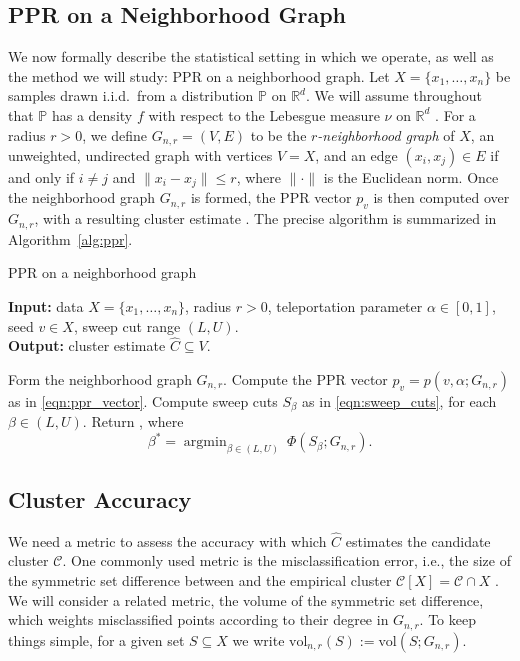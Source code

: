 \documentclass[twoside,11pt]{article}
\newcommand{\Reals}{\mathbb{R}}
\newcommand{\1}{\mathbf{1}}
\DeclareMathOperator*{\argmin}{argmin}
\newcommand{\Rd}{\Reals^d}
\newcommand{\mc}[1]{\mathcal{#1}}
\newcommand{\Pbb}{\mathbb{P}}
\newcommand{\wh}[1]{\widehat{#1}}
\newcommand{\vol}{\mathrm{vol}}
\begin{document}
\subsection{PPR on a Neighborhood Graph}
\label{subsec:ppr_neighborhood_graph}
We now formally describe the statistical setting in which we operate, as well as the method we will study: PPR on a neighborhood graph. Let $X = \{x_1,\ldots, x_n\}$ be samples drawn i.i.d.\ from a distribution $\Pbb$ on $\Rd$. We will assume throughout that $\Pbb$ has a density $f$ with respect to the Lebesgue measure $\nu$ on $\Rd$ . For a radius $r > 0$, we define $G_{n,r}=(V,E)$ to be the \emph{$r$-neighborhood graph} of $X$, an unweighted, undirected graph with vertices $V=X$, and an edge $(x_i,x_j) \in E$ if and only if $i \neq j$ and $\|x_i - x_j\| \leq r$, where $\|\cdot\|$ is the Euclidean norm. Once the neighborhood graph $G_{n,r}$ is formed, the PPR vector $p_v$ is then computed over $G_{n,r}$, with a resulting cluster estimate \smash{$\wh{C} \subseteq X$}. The precise algorithm is summarized in Algorithm~\ref{alg:ppr}.   

\begin{algorithm}
	\caption{PPR on a neighborhood graph}
	\label{alg:ppr}	
	{\bfseries Input:} data $X=\{x_1,\ldots,x_n\}$, radius $r > 0$, teleportation
	parameter $\alpha \in [0,1]$, seed $v \in X$, sweep cut range $(L,U)$. \\     
	{\bfseries Output:} cluster estimate $\wh{C} \subseteq V$.
	\begin{algorithmic}[1]
		\STATE Form the neighborhood graph $G_{n,r}$.
		\STATE Compute the PPR vector $p_v=p(v, \alpha; G_{n,r})$ as in
		\eqref{eqn:ppr_vector}.  
		\STATE Compute sweep cuts $S_{\beta}$ as in \eqref{eqn:sweep_cuts}, for each $\beta \in (L,U)$.\footnotemark 
		\STATE Return \smash{$\wh{C} = S_{\beta^*}$}, where  
		$$
		\beta^* = \argmin_{\beta \in (L,U)}~ \Phi(S_{\beta}; G_{n,r}).
		$$
	\end{algorithmic}
\end{algorithm}

\subsection{Cluster Accuracy}
We need a metric to assess the accuracy with which $\wh{C}$ estimates the candidate cluster $\mc{C}$. One commonly used metric is the misclassification error, i.e., the size of the symmetric set difference between \smash{$\wh{C}$} and the empirical cluster $\mc{C}[X] = \mc{C} \cap X$ \citep{korostelev1993,polonik1995,rigollet2009}. We will consider a related metric, the volume of the symmetric set difference, which weights misclassified points according to their degree in $G_{n,r}$. To keep things simple, for a given set $S \subseteq X$ we write $\vol_{n,r}(S) := \vol(S;G_{n,r})$. 
\end{document}
